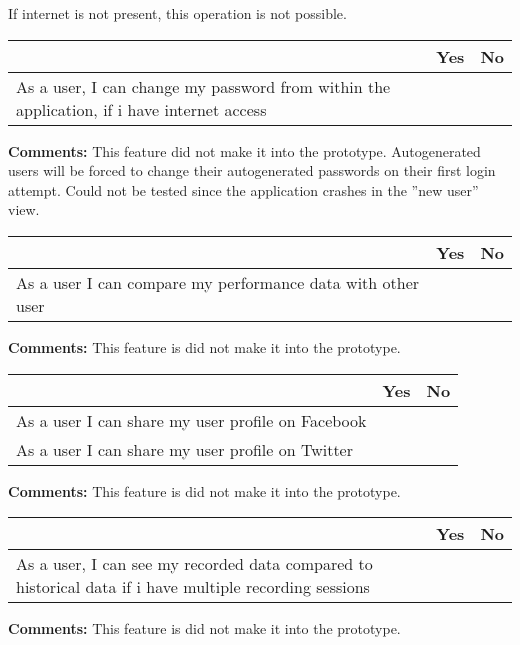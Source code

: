 
If internet is not present, this operation is not possible.

\begin{tabularx}{\textwidth}{|b|c|c|}
	\hline
	 & Yes & No \\
	\hline
	As a user, I can change my password from within the application, if i have internet access &   & \xmark  \\
	\hline
	\end{tabularx}

\vspace{3mm}
\textbf{Comments:}
This feature did not make it into the prototype.
Autogenerated users will be forced to change their autogenerated passwords on their first login attempt. Could not be tested since the application crashes in the ''new user'' view.
\vspace{3mm}


\begin{tabularx}{\textwidth}{|b|c|c|}
	\hline
	 & Yes & No \\
	\hline
	As a user I can compare my performance data with other user &   & \xmark  \\
	\hline
	\end{tabularx}

\vspace{3mm}
\textbf{Comments:}
This feature is did not make it into the prototype.
\vspace{3mm}


\begin{tabularx}{\textwidth}{|b|c|c|}
	\hline
	 & Yes & No \\
	\hline
	As a user I can share my user profile on Facebook &   & \xmark  \\
	\hline
	As a user I can share my user profile on Twitter &   & \xmark  \\
	\hline
	\end{tabularx}

\vspace{3mm}
\textbf{Comments:}
This feature is did not make it into the prototype.
\vspace{3mm}


\begin{tabularx}{\textwidth}{|b|c|c|}
	\hline
	 & Yes & No \\
	\hline
	As a user, I can see my recorded data compared to historical data if i have multiple recording sessions &   & \xmark  \\
	\hline
	\end{tabularx}

\vspace{3mm}
\textbf{Comments:}
This feature is did not make it into the prototype.
\vspace{3mm}